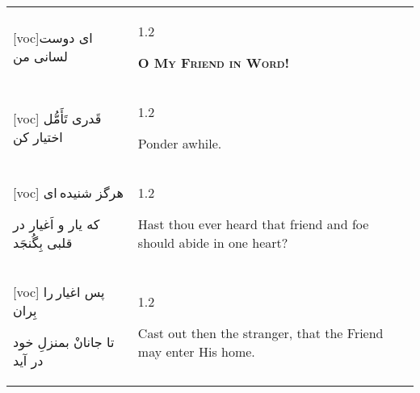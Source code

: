 \documentclass[11pt]{article}
\makeatletter
\newenvironment{orig}
  {\begin{farsi}[voc]}
  {\end{farsi}}
\newenvironment{trans}
  {\Large\begin{spacing}{1.2}\raggedright}
  {\end{spacing}}
\newenvironment{word}
  {\begin{tabular}[t]{p{2.75in}@{\hspace{3em}}p{2.75in}}}
  {\end{tabular}}
\newcommand{\ayat}[2]{\begin{orig}#1\end{orig} & \begin{trans}#2\end{trans}}
\newcommand{\heading}[2]{\textsc{\textbf{#1}} %
}
\makeatother
\begin{document}
\pagebreak

\begin{word}
\ayat{ای دوست لسانی من}{\heading{O My Friend in Word!}{}} \\ \ayat{
قَدری تَأَمُّل اختيار کن
}{Ponder awhile.} \vspace{-1ex}\\ \ayat{
هرگز شنيده ای

که يار و اَغيار در قلبی بِگُنجَد
}{Hast thou ever heard that friend and foe should abide in one
  heart?} \vspace{-1ex}\\ \ayat{
پس اغيار را بِران

تا جانانْ بمنزلِ خود در آيد
}{Cast out then the stranger, that the Friend may enter His home.}
\end{word}




\end{document}
